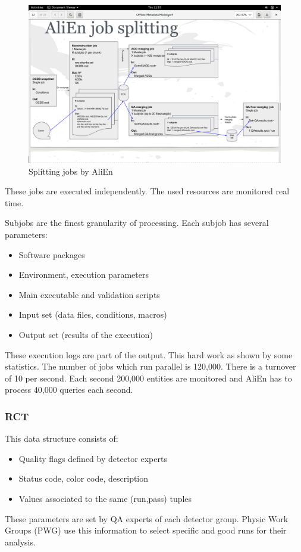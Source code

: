 \begin{figure}
  \begin{center}
    \includegraphics[scale=0.15]{./images/splitting_subjobs}
    \caption{Splitting jobs by AliEn}
    \label{fig:splitting_subjobs}
  \end{center}
\end{figure}

These jobs are executed independently. The used resources are monitored real time.

Subjobs are the finest granularity of processing. Each subjob has several parameters:
\begin{itemize}
  \item Software packages
  \item Environment, execution parameters
  \item Main executable and validation scripts
  \item Input set (data files, conditions, macros)
  \item Output set (results of the execution)
\end{itemize}
These execution logs are part of the output. This hard work as shown by some statistics. The number of jobs which run parallel  is 120,000. There is a turnover of 10 per second. Each second 200,000 entities are monitored and AliEn has to process 40,000 queries each second.

\subsubsection{RCT}
This data structure consists of:
\begin{itemize}
  \item Quality flags defined by detector experts
  \item Status code, color code, description
  \item Values associated to the same (run,pass) tuples
\end{itemize}
These parameters are set by QA experts of each detector group. Physic Work Groups (PWG) use this information to select specific and good runs for their analysis.

